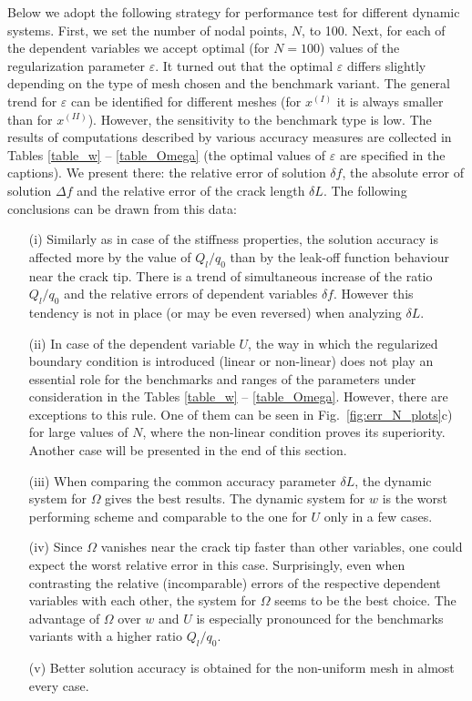 Below we adopt the following strategy for performance test for different dynamic systems. First, we set the number of nodal points, $N$, to 100. Next, for each of the dependent variables we accept optimal (for $N=100$) values of the regularization parameter $\varepsilon$. It turned out that the optimal $\varepsilon$ differs slightly depending on the type of mesh chosen and the benchmark variant. The general trend for $\varepsilon$ can be identified for different  meshes (for $x^{(I)}$ it is always smaller than for $x^{(II)}$). However, the sensitivity to the benchmark type is low. The results of computations described by various accuracy measures are collected in Tables \ref{table_w} -- \ref{table_Omega} (the optimal values of $\varepsilon$ are specified in the captions). We present there: the relative error of solution $\delta f$, the
absolute error of solution $\Delta f$ and the relative error of the crack length $\delta L$. The following conclusions can be drawn from this data:
\begin{itemize}
\item[(i)] Similarly as in case of the stiffness properties, the solution accuracy is affected more by the value of  $Q_l/q_0$ than by the leak-off function behaviour near the crack tip.
There is a trend of simultaneous increase of the ratio $Q_l/q_0$ and the relative errors of dependent variables $\delta f$. However this tendency is not in
place (or may be even reversed) when analyzing $\delta L$.
\item [(ii)] In case of the dependent variable $U$, the way in which the regularized boundary condition is introduced (linear or non-linear) does not play an essential role for the benchmarks and ranges of the parameters under consideration in the Tables \ref{table_w} -- \ref{table_Omega}. However, there are exceptions to this rule. One of them can be seen in Fig.~\ref{fig:err_N_plots}c) for large values of $N$, where the non-linear condition proves its superiority. Another case will be presented in the end of this section.
\item[(iii)] When comparing the common accuracy parameter $\delta L$, the dynamic system for $\Omega$ gives the best results.
The dynamic system for $w$ is the worst performing scheme and comparable to the one for $U$ only in a few cases.
\item[(iv)]
Since $\Omega$ vanishes near the crack tip faster than other variables, one could expect the worst relative error in this case.
Surprisingly, even when contrasting the relative (incomparable) errors of the respective dependent variables with each other, the system for $\Omega$
seems to be the best choice.
The advantage of $\Omega$ over $w$ and $U$ is especially pronounced for the benchmarks variants with a higher ratio $Q_l/q_0$.
\item[(v)] Better solution accuracy is obtained for the non-uniform mesh in almost every case.
\end{itemize}











